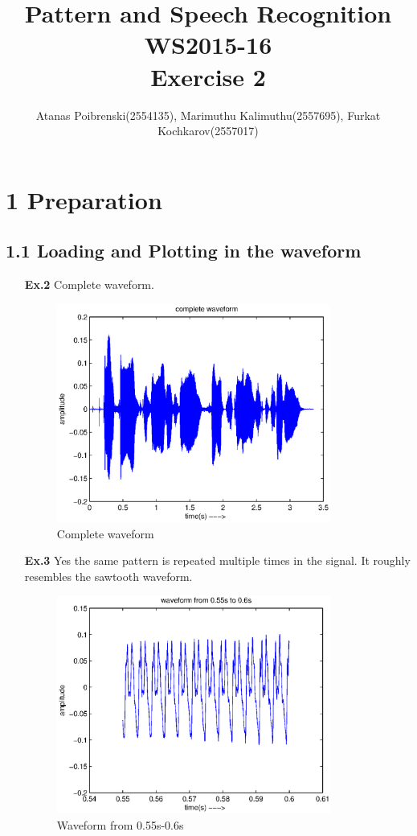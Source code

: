 \documentclass[a4paper]{article}
\title{Pattern and Speech Recognition WS2015-16 \\ Exercise 2}
\author{Atanas Poibrenski(2554135), Marimuthu Kalimuthu(2557695), Furkat Kochkarov(2557017)}
\begin{document}
\maketitle

\section*{1 Preparation}
\subsection*{1.1 Loading and Plotting in the waveform}
\begin{enumerate}
	\item[\textbf{Ex.2}] Complete waveform.
	\begin{figure}[H]
		\begin{center}
			\includegraphics[width=0.85\textwidth]{ex2.eps}
			\caption{Complete waveform}\label{fig:comwavform}		
		\end{center}
	\end{figure}
	
	\item[\textbf{Ex.3}] Yes the same pattern is repeated multiple times in the signal. It roughly resembles the sawtooth waveform.
	\begin{figure}[H]
		\begin{center}
			\includegraphics[width=0.85\textwidth]{ex3.eps}
			\caption{Waveform from 0.55s-0.6s}\label{fig:wav55}		
		\end{center}
	\end{figure}


\end{enumerate}
\end{document}
